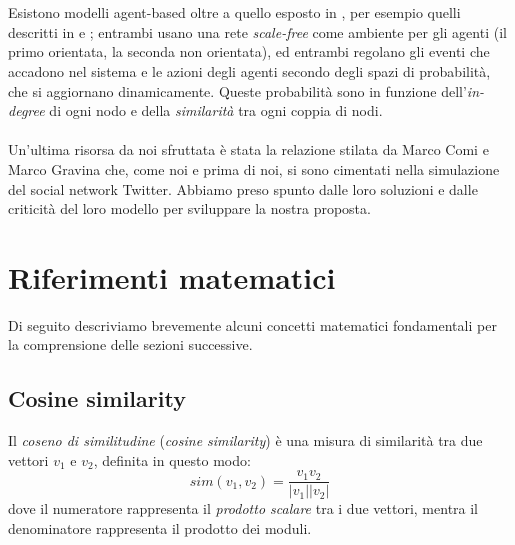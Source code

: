 \documentclass[a4paper,12pt]{article}
\begin{document}
\\
\\
Esistono modelli agent-based oltre a quello esposto in \cite{gilbert}, per esempio quelli descritti in \cite{red} e \cite{det}; entrambi usano una rete \textit{scale-free} come ambiente per gli agenti (il primo orientata, la seconda non orientata), ed entrambi regolano gli eventi che accadono nel sistema e le azioni degli agenti secondo degli spazi di probabilità, che si aggiornano dinamicamente. Queste probabilità sono in funzione dell'\textit{in-degree} di ogni nodo e della \textit{similarità} tra ogni coppia di nodi. \\
\\
Un'ultima risorsa da noi sfruttata è stata la relazione stilata da Marco Comi e Marco Gravina che, come noi e prima di noi, si sono cimentati nella simulazione del social network Twitter. Abbiamo preso spunto dalle loro soluzioni e dalle criticità del loro modello per sviluppare la nostra proposta.
\section{Riferimenti matematici}
Di seguito descriviamo brevemente alcuni concetti matematici fondamentali per la comprensione delle sezioni successive.
\label{sec:mat}
\subsection{Cosine similarity}
\label{subsec:cos}
Il \textit{coseno di similitudine} (\textit{cosine similarity}) \cite{ir} è una misura di similarità tra due vettori $v_1$ e $v_2$, definita in questo modo:
\begin{equation}
sim(v_1,v_2) = \dfrac{v_1v_2}{|v_1||v_2|}
\end{equation}
dove il numeratore rappresenta il \textit{prodotto scalare} tra i due vettori, mentra il denominatore rappresenta il prodotto dei moduli.
\end{document}
